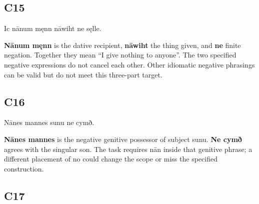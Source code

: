 \subsection*{C15}

\par\begin{minipage}{\linewidth}\raggedright
Ic nānum męnn nāwiht ne sęlle.

\textbf{Nānum męnn} is the dative recipient, \textbf{nāwiht} the thing given, and \textbf{ne} finite negation. Together they mean “I give nothing to anyone”. The two specified negative expressions do not cancel each other. Other idiomatic negative phrasings can be valid but do not meet this three-part target.

\end{minipage}\par\addvspace{4pt}

\subsection*{C16}

\par\begin{minipage}{\linewidth}\raggedright
Nānes mannes sunu ne cymð.

\textbf{Nānes mannes} is the negative genitive possessor of subject sunu. \textbf{Ne cymð} agrees with the singular son. The task requires nān inside that genitive phrase; a different placement of no could change the scope or miss the specified construction.

\end{minipage}\par\addvspace{4pt}

\subsection*{C17}

